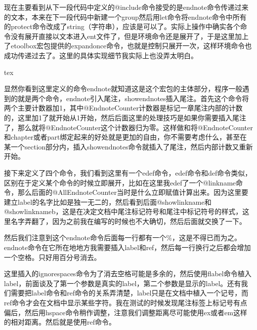 \documentclass[11pt,oneside]{book}
\begin{document}
\begin{common-format}
现在主要看到从下一段代码中定义的@include命令接受的是endnote命令传递过来的文本，本来在下一段代码中新建一个group然后用let命令将endnote命令中所有的protect命令改成了string（字符串），应该是可以了。实际上操作中确实各个命令没有展开直接以文本进入ent文件了，但是环境命令还是展开了，于是这里加上了etoolbox宏包提供的expandonce命令，也就是控制只展开一次，这样环境命令也成功传递过去了。这里的具体实现细节我实际上也没弄太明白。

\begin{cverbatim}{tex}
\DeclareRobustCommand*\endnote[1]{%
\stepcounter{@EndnoteCounter}%
\stepcounter{@AllEndnoteCounter}%
\edef\@linkname{enote:\arabic{@AllEndnoteCounter}}%
\edef\@linknameb{enote:\arabic{@AllEndnoteCounter}b}%
\edef\@showlinknameb{\endnotemark}%
\edef\@showlinkname{\endnotemarkback}%
\ignorespaces\flabel{\@linkname}{\@showlinkname}%
\ignorespaces\hspace{-0.5ex}\ref{\@linkname b}%
\if@entopen \else \@openent \fi%
\begingroup%
\let\protect\string%
\gdef\@include{#1}%
\endgroup%
\@writeent%
}
\end{cverbatim}
显然你看到这里定义的命令endnote就知道这是这个宏包的主体部分，程序一般遇到的就是两个命令，endnote引入尾注，showendnotes插入尾注。首先这个命令将两个主要计数器加1，其中@EndnoteCounter计数器是标记一章尾注内部的计数的，这里加1了就开始从1开始，然后后面这里的处理技巧是如果你需要插入尾注了，那么就将@EndnoteCounter这个计数器归为零。这样做和将@EndnoteCounter和chapter或者part绑定起来的好处就是更加的自由，你不需要考虑什么，甚至在某一个section部分内，插入showendnotes命令就插入了尾注，然后内部计数又重新开始。

接下来定义了四个命令，我们看到这里有一个edef命令，edef命令和def命令类似，区别在于定义某个命令的时候立即展开，比如在这里我edef了一个@linkname命令，那么后面的@AllEndnoteCounter当时是什么立即赋值计算出来。因为这里要建立label的名字比如是独一无二的，然后看到后面@showlinkname和@showlinknameb，这是在决定文档中尾注标记符号和尾注中标记符号的样式，这里名字弄翻了，因为之前我在编写的时候也不大确切，然后后面就交换了一下。

然后我们注意到这个endnote命令后面每一行都有一个\%，这是不得已而为之。endnote命令在它所在地地方我需要插入label和ref，然后每一行换行之后都会增加一个空格。只好用百分号消去。

这里插入的ignorespaces命令为了消去空格可能是多余的，然后使用flabel命令植入label，前面谈及了第一个参数是真实的label，第二个参数是显示的label。还有我们需要把label命令和ref命令的关系弄清楚，label只是在文档中植入一个记号，而ref命令才会在文档中显示某些字符。我在测试的时候发现尾注标签上标记号有点偏后，然后用hspace命令稍作调整，注意我们调整距离尽可能使用ex或者em这样的相对距离。然后就是使用ref命令。


\end{common-format}
\end{document}
